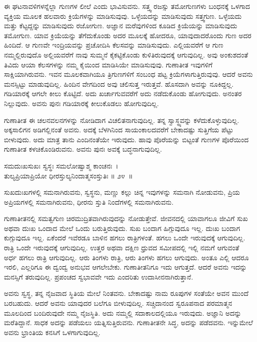ಈ ಘಟನಾವಳಿಗಳನ್ನೆಲ್ಲಾ ಗುಣಗಳ ಲೀಲೆ ಎಂದು ಭಾವಿಸುವನು. ಸತ್ತ್ವ ರಜಸ್ಸು ತಮೋಗುಣಗಳು ಬಂಧನಕ್ಕೆ ಒಳಗಾದ ವ್ಯಕ್ತಿಯ ಮೂಲಕ ಹಲವಾರು ಕ್ರಿಯೆಗಳನ್ನು ಮಾಡಿಸುವುವು. ಒಳ್ಳೆಯ\-ದನ್ನು ಮಾಡಿಸುವುದು ಸತ್ತ್ವಗುಣ. ಒಳ್ಳೆಯದು ಮತ್ತು ಕೆಟ್ಟದ್ದನ್ನು ಮಾಡಿಸುವುದು ರಜೋಗುಣ. ಅಜ್ಞಾನ ಮರೆವುಗಳಿಂದ ಕೂಡಿದ ಕ್ರಿಯೆಯನ್ನು ಮಾಡಿಸುವುದು ತಮೋಗುಣ. ಯಾವ ಕ್ರಿಯೆಯನ್ನು ತೆಗೆದುಕೊಂಡು ಅದರ ಮೂಲಕ್ಕೆ ಹೋದರೂ, ಯಾವುದಾದರೊಂದು ಗುಣ ಅದರ ಹಿಂದಿದೆ. ಆ ಗುಣವೇ ಇಂದ್ರಿಯವನ್ನು ಪ್ರಚೋದಿಸಿ ಕೆಲಸವನ್ನು ಮಾಡಿಸುವುದು. ಎಲ್ಲಿಯವರೆಗೆ ಆ ಗುಣ ನಮ್ಮಲ್ಲಿರುವುದೊ ಅಲ್ಲಿಯವರೆಗೆ ನಾವು ಸುಮ್ಮನೆ ಕೈಕಟ್ಟಿಕೊಂಡು ಕುಳಿತಿರುವುದಕ್ಕೆ ಆಗುವುದಿಲ್ಲ. ಅವು ಅಂಕುಶದಂತೆ ತಿವಿದು ಆಯಾ ಕೆಲಸಗಳನ್ನು ನಮ್ಮ ಕೈಯಿಂದ ಮಾಡಿಸಿಯೇ ಮಾಡಿಸುವುವು. ಗುಣಾತೀತ ಇವುಗಳಿಗೆ ಸಾಕ್ಷಿಯಾಗಿರುವನು. ಇವನ ಮೂಲಕವಾಗಿಯೂ ತ್ರಿಗುಣಗಳಿಗೆ ಸಂಬಂಧ ಪಟ್ಟ ಕ್ರಿಯೆಗಳಾಗುತ್ತಿರುವುವು. ಆದರೆ ಅವನು ಮನಸ್ಸಿಟ್ಟು ಮಾಡುವುದಿಲ್ಲ. ಹಿಂದಿನ ವೇಗದಿಂದ ಅವು ಚಲಿಸುತ್ತ ಇರುತ್ತವೆ. ಹೊಸದಾಗಿ ಅವನ್ನು ನೂಕಿದ್ದಲ್ಲ. ಗಡಿಯಾರಕ್ಕೆ ಆಗಲೇ ಕೀಲು ಕೊಟ್ಟಿದೆ. ಅದು ಖರ್ಚಾಗುವವರೆಗೆ ಅದು ನಡೆದುಕೊಂಡು ಹೋಗುವುದು. ಅನಂತರ ನಿಲ್ಲುವುದು. ಅವನು ಪುನಃ ಗಡಿಯಾರಕ್ಕೆ ಕೀಲುಕೊಡಲು ಹೋಗುವುದಿಲ್ಲ.

ಗುಣಾತೀತ ಈ ಚಲನವಲನಗಳನ್ನು ನೋಡಿದಾಗ ವಿಚಲಿತನಾಗುವುದಿಲ್ಲ. ತನ್ನ ಸ್ವಾಸ್ಥ್ಯವನ್ನು ಕಳೆದುಕೊಳ್ಳುವುದಿಲ್ಲ. ಅಕ್ಕಸಾಲಿಗನ ಅಡಿಗಲ್ಲಿನಂತೆ ಅವನು. ಅದಕ್ಕೆ ಬೆಳಗಿನಿಂದ ಸಾಯಂಕಾಲದವರೆಗೆ ಬೇಕಾದಷ್ಟು ಸುತ್ತಿಗೆಯ ಪೆಟ್ಟು ಬೀಳುವುದು. ಅದು ಮಾತ್ರ ತಾನು ಎಂದಿನಂತೆಯೇ ಇರುವುದು. ಹಾವು ಪೊರೆಯನ್ನು ಬಿಟ್ಟಂತೆ ಗುಣಗಳ ಪೊರೆಯಿಂದ ಗುಣಾತೀತ ಕಳಚಿಕೊಂಡಿರುವನು. ಅವನು ಪುನಃ ಅವಕ್ಕೆ ಬದ್ಧನಾಗುವುದಿಲ್ಲ.

\begin{shloka}
ಸಮದುಃಖಸುಖಃ ಸ್ವಸ್ಥಃ ಸಮಲೋಷ್ವಾಶ್ಮ ಕಾಂಚನಃ~।\\ತುಲ್ಯಪ್ರಿಯಾಪ್ರಿಯೋ ಧೀರಸ್ತುಲ್ಯನಿಂದಾತ್ಮಸಂಸ್ತುತಿಃ \hfill॥ ೨೪~॥
\end{shloka}

\newpage

\begin{artha}
ಸುಖದುಃಖಗಳಲ್ಲಿ ಸಮನಾಗಿರುವನು, ಸ್ವಸ್ಥನು, ಮಣ್ಣು ಕಲ್ಲು ಚಿನ್ನ ಇವುಗಳನ್ನು ಸಮನಾಗಿ ನೋಡುವನು, ಪ್ರಿಯ ಅಪ್ರಿಯಗಳಲ್ಲಿ ಸಮನಾಗಿರುವನು, ಧೀರನು ಸ್ತುತಿ ನಿಂದೆಗಳಲ್ಲಿ ಸಮ\-ನಾಗಿರುವನು.
\end{artha}

ಗುಣಾತೀತನಲ್ಲಿ ಸಮತ್ವಗುಣ ಚಿರಮುದ್ರಿತವಾಗಿರುವುದನ್ನು ನೋಡುತ್ತೇವೆ. ಜೀವನದಲ್ಲಿ ಯಾವಾಗಲೂ ಜೀವಿಗೆ ಸುಖ ಅಥವಾ ದುಃಖ ಒಂದಾದ ಮೇಲೆ ಒಂದು ಬರುತ್ತಿರುವುದು. ಸುಖ ಬಂದಾಗ ಹಿಗ್ಗುವುದೂ ಇಲ್ಲ. ದುಃಖ ಬಂದಾಗ ಕುಗ್ಗುವುದೂ ಇಲ್ಲ. ಏಕೆಂದರೆ ಇವೆರಡೂ ಬಾಳಿನ ಹಗಲು ರಾತ್ರಿಗಳಂತೆ. ಹಗಲು ಒಂದೇ ಇರುವುದಕ್ಕೆ ಆಗುವುದಿಲ್ಲ. ರಾತ್ರಿ ಒಂದೇ ಇರುವುದಕ್ಕೆ ಆಗುವುದಿಲ್ಲ. ಉತ್ತರ ಅಥವಾ ದಕ್ಷಿಣ ಧ್ರುವದ ಸಮೀಪದಲ್ಲಿ ಇಲ್ಲಿ ನಮಗೆ ಆಗುವಂತೆ ಅರ್ಧ ಹಗಲು ರಾತ್ರಿ ಆಗುವುದಿಲ್ಲ. ಆರು ತಿಂಗಳು ರಾತ್ರಿ, ಆರು ತಿಂಗಳು ಹಗಲು ಆಗುವುದು. ಅಂತೂ ಎಲ್ಲಿ ಆದರೂ ಇರಲಿ, ಎಲ್ಲರಿಗೂ ಈ ದ್ವಂದ್ವ ಅನುಭವ ಆಗಲೇಬೇಕು. ಗುಣಾತೀತನಿಗೂ ಇದು ಆಗುತ್ತದೆ. ಆದರೆ ಅವನು ಇದನ್ನು ಮನಸ್ಸಿಗೆ ತರುವುದಿಲ್ಲ. ಪ್ರಪಂಚದ ಸ್ವಭಾವವೇ ಇದು ಎಂದರಿತು ಉದಾಸೀನನಾಗಿರುತ್ತಾನೆ.

ಅವನು ಸ್ವಸ್ಥ, ತನ್ನ ನೈಜವಾದ ಸ್ಥಿತಿಯ ಮೇಲೆ ನಿಂತವನು. ಬೇಕಾದಷ್ಟು ನಾಮ ರೂಪುಗಳ ಸಂತೆಯೇ ಅವನ ಮುಂದೆ ಬರಬಹುದು. ಆದರೆ ಅವನು ಯಾವುದರ ಬಲೆಗೂ ಬೀಳುವುದಿಲ್ಲ. ಸಚ್ಚಿದಾನಂದ ಸ್ವರೂಪನಾದ ಪರಮಾತ್ಮನ ಮೂಲದಿಂದ ಬಂದಿರುವುದೇ ನಮ್ಮ ನೈಜಸ್ಥಿತಿ. ಅದು ನಮ್ಮಲ್ಲಿ ಸದಾಕಾಲದಲ್ಲಿಯೂ ಇರುವುದು. ಅಜ್ಞಾನಿ ಅದನ್ನು ಮರೆತಿದ್ದಾನೆ. ಸಾಧಕ ಅದನ್ನು ಪಡೆಯಲು ಯತ್ನಿಸುತ್ತಿರುವನು. ಗುಣಾತೀತನೇ ಸಿದ್ಧ, ಅದನ್ನು ಪಡೆದವನು. ಇನ್ನುಮೇಲೆ ಅವನು ಭ್ರಾಂತಿಯ ಕನಸಿಗೆ ಒಳಗಾಗುವುದಿಲ್ಲ.

